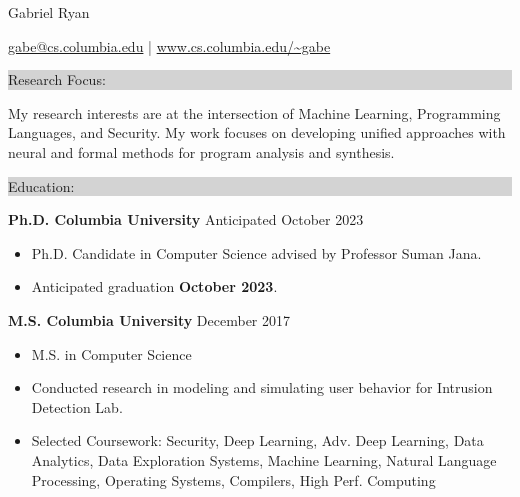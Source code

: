 \documentclass{article} %
\newcommand{\rsection}[1]{
  \hspace{-0.4cm}\vspace{0.1cm}
\colorbox{lightgrey}{
\begin{minipage}{1.07\linewidth}
\vspace{0.22cm}
\fontsize{14pt}{16pt}\selectfont #1
\vspace{0.12cm}
\end{minipage}
}
\vspace*{-0.1cm}
}
\newcommand{\rjob}[2]{
  \hspace*{-0.3cm}
{\fontsize{10pt}{12pt}\selectfont #1} \hfill #2
\vspace*{0.1cm}
\hspace*{-1.2cm}
}
\newenvironment{ritemize}{
\hspace*{-0.8cm}
\begin{minipage}{1.05\linewidth}
\begin{itemize}
}{
\end{itemize}
\end{minipage}
}
\newcommand{\ritem}{
\item[-]
}
\begin{document}
\hspace*{-0.45cm}
{\fontsize{22pt}{22pt}\selectfont Gabriel Ryan}\\
\begin{minipage}{\linewidth}
\vspace{0.1cm}
  {\fontsize{12}{12}\selectfont
      \href{mailto:gabe@cs.columbia.edu}{gabe@cs.columbia.edu} | \url{www.cs.columbia.edu/~gabe}
  }
\end{minipage}
\vspace{-0.15cm}

\rsection{Research Focus:}

My research interests are at the intersection of Machine Learning, Programming Languages, and Security. My work focuses on developing unified approaches with neural and formal methods for program analysis and synthesis.


\rsection{Education:}

\rjob{\textbf{Ph.D. Columbia University}}{Anticipated October 2023}\\
\begin{ritemize}
\ritem Ph.D. Candidate in Computer Science advised by Professor Suman Jana.
    \ritem Anticipated graduation \textbf{October 2023}.
\end{ritemize}

\rjob{\textbf{M.S. Columbia University}}{December 2017}\\
\begin{ritemize}
  \ritem M.S. in Computer Science %
  \ritem Conducted research in modeling and simulating user behavior for Intrusion Detection Lab.
  \ritem Selected Coursework: Security, Deep Learning, Adv. Deep Learning, Data Analytics, Data Exploration Systems, Machine Learning, Natural Language Processing, Operating Systems, Compilers, High Perf. Computing
\end{ritemize}
\end{document}
